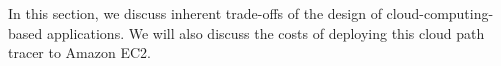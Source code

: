 In this section, we discuss inherent trade-offs of the design of cloud-computing-based applications.
We will also discuss the costs of deploying this cloud path tracer to Amazon EC2.